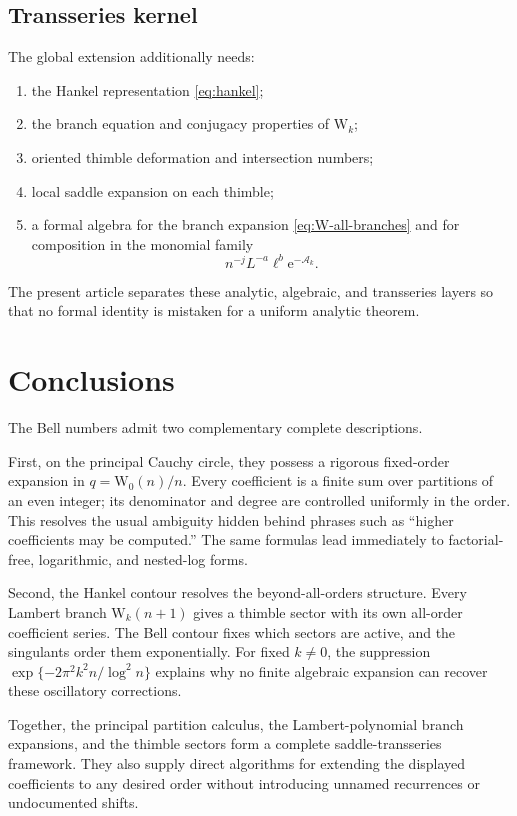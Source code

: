 \documentclass[11pt,a4paper]{article}
\theoremstyle{definition}
\newcommand{\W}{\mathrm W}
\newcommand{\ee}{\mathrm e}
\newcommand{\cA}{\mathcal A}
\begin{document}
\subsection{Transseries kernel}

The global extension additionally needs:
\begin{enumerate}
 \item the Hankel representation \eqref{eq:hankel};
 \item the branch equation and conjugacy properties of $\W_k$;
 \item oriented thimble deformation and intersection numbers;
 \item local saddle expansion on each thimble;
 \item a formal algebra for the branch expansion \eqref{eq:W-all-branches}
       and for composition in the monomial family
       \[n^{-j}L^{-a}\ell^b\ee^{-\cA_k}.\]
\end{enumerate}
The present article separates these analytic, algebraic, and transseries
layers so that no formal identity is mistaken for a uniform analytic theorem.

\section{Conclusions}

The Bell numbers admit two complementary complete descriptions.

First, on the principal Cauchy circle, they possess a rigorous fixed-order
expansion in $q=\W_0(n)/n$.  Every coefficient is a finite sum over partitions
of an even integer; its denominator and degree are controlled uniformly in the
order.  This resolves the usual ambiguity hidden behind phrases such as
``higher coefficients may be computed.''  The same formulas lead immediately
to factorial-free, logarithmic, and nested-log forms.

Second, the Hankel contour resolves the beyond-all-orders structure.  Every
Lambert branch $\W_k(n+1)$ gives a thimble sector with its own all-order
coefficient series.  The Bell contour fixes which sectors are active, and the
singulants order them exponentially.  For fixed $k\ne0$, the suppression
$\exp\{-2\pi^2k^2n/\log^2n\}$ explains why no finite algebraic expansion can
recover these oscillatory corrections.

Together, the principal partition calculus, the Lambert-polynomial branch
expansions, and the thimble sectors form a complete saddle-transseries
framework.  They also supply direct algorithms for extending the displayed
coefficients to any desired order without introducing unnamed recurrences or
undocumented shifts.
\end{document}
